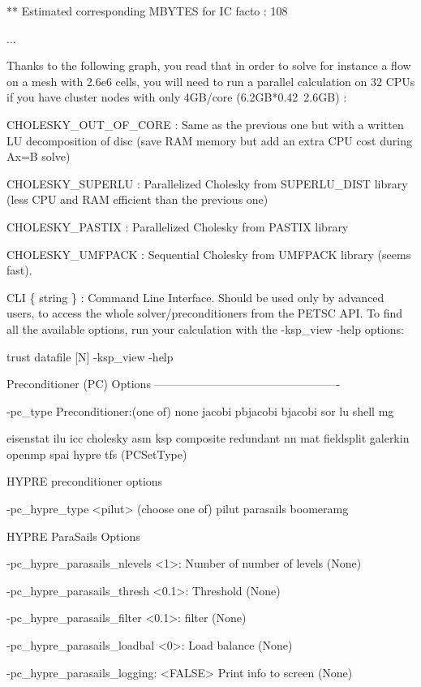  ** Estimated corresponding MBYTES for IC facto            :       108 

...



Thanks to the following graph, you read that in order to solve for instance a flow on a mesh with 2.6e6 cells, you will need to run a parallel calculation on 32 CPUs if you have cluster nodes with only 4GB/core (6.2GB*0.42~2.6GB) :



	CHOLESKY\_OUT\_OF\_CORE : Same as the previous one but with a written LU decomposition of disc (save RAM memory but add an extra CPU cost during Ax=B solve)

	CHOLESKY\_SUPERLU : Parallelized Cholesky from SUPERLU\_DIST library (less CPU and RAM efficient than the previous one) 

	CHOLESKY\_PASTIX : Parallelized Cholesky from PASTIX library

	CHOLESKY\_UMFPACK : Sequential Cholesky from UMFPACK library (seems fast).

          CLI \{ string \} : Command Line Interface. Should be used only by advanced users,  to access the whole solver/preconditioners from the PETSC API. To find all the available options, run your calculation with the -ksp\_view -help options:



trust datafile [N]  -ksp\_view -help

Preconditioner (PC) Options -------------------------------------------------

  -pc\_type Preconditioner:(one of) none jacobi pbjacobi bjacobi sor lu shell mg

      eisenstat ilu icc cholesky asm ksp composite redundant nn mat fieldsplit galerkin openmp spai hypre tfs (PCSetType)

  HYPRE preconditioner options

  -pc\_hypre\_type <pilut> (choose one of) pilut parasails boomeramg

  HYPRE ParaSails Options

  -pc\_hypre\_parasails\_nlevels <1>: Number of number of levels (None)

  -pc\_hypre\_parasails\_thresh <0.1>: Threshold (None)

  -pc\_hypre\_parasails\_filter <0.1>: filter (None)

  -pc\_hypre\_parasails\_loadbal <0>: Load balance (None)

  -pc\_hypre\_parasails\_logging: <FALSE> Print info to screen (None)

